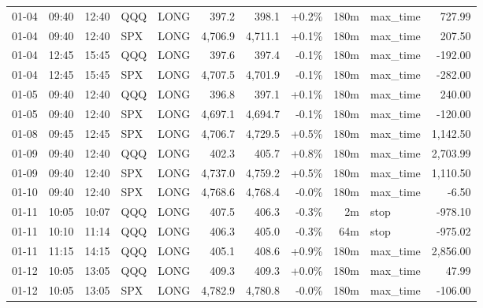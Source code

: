 \documentclass[11pt,a4paper,twoside]{article}
\begin{document}
\begin{center}
\begin{longtable}{>{\color{txtmain}}l l l l l r r r r >{\color{txtmain}}l r}
01-04 & 09:40 & 12:40 & QQQ & LONG & 397.2 & 398.1 & \textcolor{wingreen}{+0.2\%} & 180m & max\_time & \textcolor{wingreen}{727.99} \\
01-04 & 09:40 & 12:40 & SPX & LONG & 4,706.9 & 4,711.1 & \textcolor{wingreen}{+0.1\%} & 180m & max\_time & \textcolor{wingreen}{207.50} \\
01-04 & 12:45 & 15:45 & QQQ & LONG & 397.6 & 397.4 & \textcolor{lossred}{-0.1\%} & 180m & max\_time & \textcolor{lossred}{-192.00} \\
01-04 & 12:45 & 15:45 & SPX & LONG & 4,707.5 & 4,701.9 & \textcolor{lossred}{-0.1\%} & 180m & max\_time & \textcolor{lossred}{-282.00} \\
01-05 & 09:40 & 12:40 & QQQ & LONG & 396.8 & 397.1 & \textcolor{wingreen}{+0.1\%} & 180m & max\_time & \textcolor{wingreen}{240.00} \\
01-05 & 09:40 & 12:40 & SPX & LONG & 4,697.1 & 4,694.7 & \textcolor{lossred}{-0.1\%} & 180m & max\_time & \textcolor{lossred}{-120.00} \\
01-08 & 09:45 & 12:45 & SPX & LONG & 4,706.7 & 4,729.5 & \textcolor{wingreen}{+0.5\%} & 180m & max\_time & \textcolor{wingreen}{1,142.50} \\
01-09 & 09:40 & 12:40 & QQQ & LONG & 402.3 & 405.7 & \textcolor{wingreen}{+0.8\%} & 180m & max\_time & \textcolor{wingreen}{2,703.99} \\
01-09 & 09:40 & 12:40 & SPX & LONG & 4,737.0 & 4,759.2 & \textcolor{wingreen}{+0.5\%} & 180m & max\_time & \textcolor{wingreen}{1,110.50} \\
01-10 & 09:40 & 12:40 & SPX & LONG & 4,768.6 & 4,768.4 & \textcolor{lossred}{-0.0\%} & 180m & max\_time & \textcolor{lossred}{-6.50} \\
01-11 & 10:05 & 10:07 & QQQ & LONG & 407.5 & 406.3 & \textcolor{lossred}{-0.3\%} & 2m & stop & \textcolor{lossred}{-978.10} \\
01-11 & 10:10 & 11:14 & QQQ & LONG & 406.3 & 405.0 & \textcolor{lossred}{-0.3\%} & 64m & stop & \textcolor{lossred}{-975.02} \\
01-11 & 11:15 & 14:15 & QQQ & LONG & 405.1 & 408.6 & \textcolor{wingreen}{+0.9\%} & 180m & max\_time & \textcolor{wingreen}{2,856.00} \\
01-12 & 10:05 & 13:05 & QQQ & LONG & 409.3 & 409.3 & \textcolor{wingreen}{+0.0\%} & 180m & max\_time & \textcolor{wingreen}{47.99} \\
01-12 & 10:05 & 13:05 & SPX & LONG & 4,782.9 & 4,780.8 & \textcolor{lossred}{-0.0\%} & 180m & max\_time & \textcolor{lossred}{-106.00} \\

\end{longtable}
\end{center}
\end{document}

